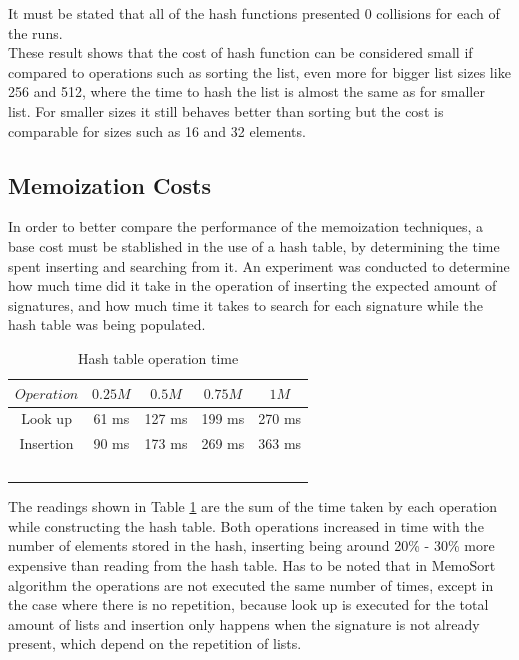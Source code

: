 \documentclass[a4paper,12pt]{article}
\begin{document}
It must be stated that all of the hash functions presented 0 collisions for each of the runs.\\

These result shows that the cost of hash function can be considered small if compared to operations such as sorting the list, even more for bigger list sizes like 256 and 512, where the time to hash the list is almost the same as for smaller list. For smaller sizes it still behaves better than sorting but the cost is comparable for sizes such as 16 and 32 elements.

\subsection{Memoization Costs}

In order to better compare the performance of the memoization techniques, a base cost must be stablished in the use of a hash table, by determining the time spent inserting and searching from it. An experiment was conducted to determine how much time did it take in the operation of inserting the expected amount of signatures, and how much time it takes to search for each signature while the hash table was being populated. \\

\begin{table}[H]
\centering
\begin{tabular}{|c|c|c|c|c|}   \hline
	{$Operation$} & {$0.25M$} & {$0.5M$} & {$0.75M$} & {$1M$} \\  \hline
	Look up & 61 ms & 127 ms& 199 ms & 270 ms\\ 
	Insertion & 90 ms & 173 ms& 269 ms& 363 ms\\ \ \hline
\end{tabular}
\caption{Hash table operation time}
\label{ref:MemCostTable}
\end{table}

The readings shown in Table \ref{ref:MemCostTable} are the sum of the time taken by each operation while constructing the hash table. Both operations increased in time with the number of elements stored in the hash, inserting being around 20\% - 30\% more expensive than reading from the hash table. Has to be noted that in MemoSort algorithm the operations are not executed the same number of times, except in the case where there is no repetition, because look up is executed for the total amount of lists and insertion only happens when the signature is not  already present, which depend on the repetition of lists.
\end{document}
